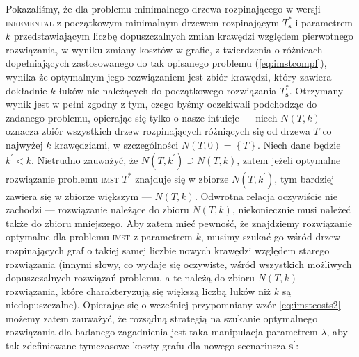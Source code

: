 Pokazaliśmy, że dla problemu minimalnego drzewa rozpinającego w wersji \textsc{inremental} z początkowym minimalnym drzewem rozpinającym $T^{\ast}_{\textbf{s}}$ i parametrem $k$ przedstawiającym liczbę dopuszczalnych zmian krawędzi względem pierwotnego rozwiązania, w wyniku zmiany kosztów w grafie, z twierdzenia o różnicach dopełniających zastosowanego do tak opisanego problemu (\ref{eq:imstcompl}), wynika że optymalnym jego rozwiązaniem jest zbiór krawędzi, który zawiera dokładnie $k$ łuków nie należących do początkowego rozwiązania $T^{\ast}_{\textbf{s}}$. Otrzymany wynik jest w pełni zgodny z tym, czego byśmy oczekiwali podchodząc do zadanego problemu, opierając się tylko o nasze intuicje --- niech $N \left( T, k \right)$ oznacza zbiór wszystkich drzew rozpinających różniących się od drzewa $T$ co najwyżej $k$ krawędziami, w szczególności $N \left( T, 0 \right) = \left\{ T \right\}$. Niech dane będzie $k^{\prime} < k$. Nietrudno zauważyć, że $N \left( T, k^{\prime} \right) \supseteq N \left( T, k \right)$, zatem jeżeli optymalne rozwiązanie problemu \textsc{imst} $T^{\ast}$ znajduje się w zbiorze $N \left( T, k^{\prime} \right)$, tym bardziej zawiera się w zbiorze większym --- $N \left( T, k \right)$. Odwrotna relacja oczywiście nie zachodzi --- rozwiązanie należące do zbioru $N \left( T, k \right)$, niekoniecznie musi należeć także do zbioru mniejszego. Aby zatem mieć pewność, że znajdziemy rozwiązanie optymalne dla problemu \textsc{imst} z parametrem $k$, musimy szukać go wśród drzew rozpinających graf o takiej samej liczbie nowych krawędzi względem starego rozwiązania (innymi słowy, co wydaje się oczywiste, wśród wszystkich możliwych dopuszczalnych rozwiązań problemu, a te należą do zbioru $N \left( T, k \right)$ --- rozwiązania, które charakteryzują się większą liczbą łuków niż $k$ są niedopuszczalne). Opierając się o wcześniej przypomniany wzór \ref{eq:imstcosts2} możemy zatem zauważyć, że rozsądną strategią na szukanie optymalnego rozwiązania dla badanego zagadnienia jest taka manipulacja parametrem $\lambda$, aby tak zdefiniowane tymczasowe koszty grafu dla nowego scenariusza $\textbf{s}^{\prime}$:

